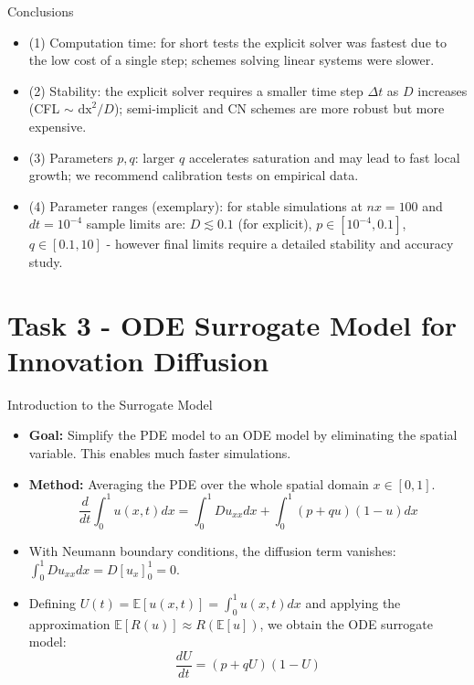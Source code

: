 \documentclass[9pt]{beamer}
\begin{document}
\begin{frame}{Conclusions}
\begin{itemize}
  \item (1) Computation time: for short tests the explicit solver was fastest due to the low cost of a single step; schemes solving linear systems were slower.
  \item (2) Stability: the explicit solver requires a smaller time step $\Delta t$ as $D$ increases (CFL \(\sim\) $\mathrm{dx}^2/D$); semi-implicit and CN schemes are more robust but more expensive.
  \item (3) Parameters $p,q$: larger $q$ accelerates saturation and may lead to fast local growth; we recommend calibration tests on empirical data.
  \item (4) Parameter ranges (exemplary): for stable simulations at $nx=100$ and $dt=10^{-4}$ sample limits are: $D\lesssim0.1$ (for explicit), $p\in[10^{-4},0.1]$, $q\in[0.1,10]$ - however final limits require a detailed stability and accuracy study.
\end{itemize}
\end{frame}

\section*{Task 3 - ODE Surrogate Model for Innovation Diffusion}

\begin{frame}{Introduction to the Surrogate Model}
\begin{itemize}
  \item \textbf{Goal:} Simplify the PDE model to an ODE model by eliminating the spatial variable. This enables much faster simulations.
  \item \textbf{Method:} Averaging the PDE over the whole spatial domain $x \in [0, 1]$.
  $$ \frac{d}{dt} \int_0^1 u(x,t) dx = \int_0^1 D u_{xx} dx + \int_0^1 (p+qu)(1-u) dx $$
  \item With Neumann boundary conditions, the diffusion term vanishes: $\int_0^1 D u_{xx} dx = D[u_x]_0^1 = 0$.
  \item Defining $U(t) = \mathbb{E}[u(x,t)] = \int_0^1 u(x,t) dx$ and applying the approximation $\mathbb{E}[R(u)] \approx R(\mathbb{E}[u])$, we obtain the ODE surrogate model:
  $$ \frac{dU}{dt} = (p + qU)(1-U) $$
\end{itemize}
\end{frame}
\end{document}
